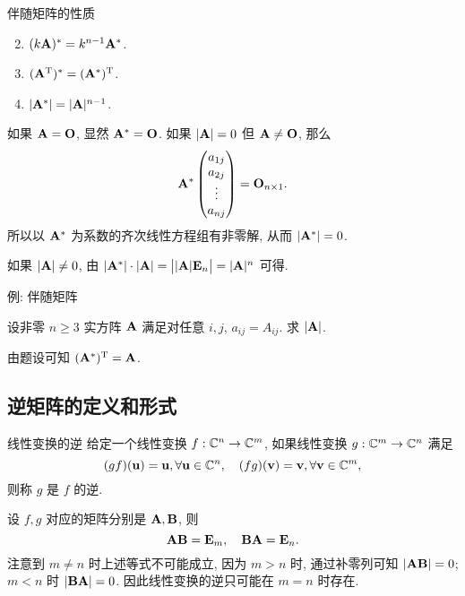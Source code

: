 \begin{frame}{伴随矩阵的性质}
	\onslide<+->
	\begin{block@}
		\begin{enumerate}
			\setcounter{enumi}{1}
			\item $(k{\mathbf{A}})^*=k^{n-1}{\mathbf{A}}^*$.
			\item $({\mathbf{A}}^{\mathrm{T}})^*=({\mathbf{A}}^*)^{\mathrm{T}}$.
			\item $|{\mathbf{A}}^*|=|{\mathbf{A}}|^{n-1}$.
		\end{enumerate}
	\end{block@}
	\onslide<+->
	如果 ${\mathbf{A}}={\mathbf{O}}$, 显然 ${\mathbf{A}}^*={\mathbf{O}}$.
	\onslide<+->
	如果 $|\bfA|=0$ 但 ${\mathbf{A}}\neq {\mathbf{O}}$, 那么
	\[{\mathbf{A}}^*\begin{pmatrix}
		a_{1j}\\a_{2j}\\\vdots\\a_{nj}
	\end{pmatrix}={\mathbf{O}}_{n\times 1}.\]
	\onslide<+->
	所以以 ${\mathbf{A}}^*$ 为系数的齐次线性方程组有非零解, 从而 $|{\mathbf{A}}^*|=0$.

	\onslide<+->
	如果 $|{\mathbf{A}}|\neq0$, 由 $|{\mathbf{A}}^*|\cdot|{\mathbf{A}}|=\bigl||{\mathbf{A}}|{\mathbf{E}}_n\bigr|=|{\mathbf{A}}|^n$ 可得.
\end{frame}


\begin{frame}{例: 伴随矩阵}
	\onslide<+->
	\begin{example}
		设非零 $n\ge 3$ 实方阵 ${\mathbf{A}}$ 满足对任意 $i,j$, $a_{ij}=A_{ij}$. 求 $|{\mathbf{A}}|$.
	\end{example}
	\onslide<+->
	\begin{solution}
		由题设可知 $({\mathbf{A}}^*)^{\mathrm{T}}={\mathbf{A}}$.
		\onslide<+->{%
		从而 $|\bfA|=0$ 或 $1$.
		}
		
	\end{solution}
\end{frame}


\subsection{逆矩阵的定义和形式}
\begin{frame}{线性变换的逆}
	\onslide<+->
	给定一个线性变换 $f:{\mathbb{C}}^n\rightarrow{\mathbb{C}}^m$, 如果线性变换 $g:{\mathbb{C}}^m\to{\mathbb{C}}^n$ 满足
	\[(gf)({\mathbf{u}})={\mathbf{u}},\forall {\mathbf{u}}\in{\mathbb{C}}^n,\quad
	(fg)({\mathbf{v}})={\mathbf{v}},\forall {\mathbf{v}}\in{\mathbb{C}}^m,\]
	\onslide<+->
	则称 $g$ 是 $f$ 的逆.

	\onslide<+->
	设 $f,g$ 对应的矩阵分别是 ${\mathbf{A}},{\mathbf{B}}$, 则
	\[{\mathbf{A}}{\mathbf{B}}={\mathbf{E}}_m,\quad {\mathbf{B}}{\mathbf{A}}={\mathbf{E}}_n.\]
	\onslide<+->
	注意到 $m\neq n$ 时上述等式不可能成立, 因为 $m>n$ 时, 通过补零列可知 $|{\mathbf{A}}{\mathbf{B}}|=0$; $m<n$ 时 $|{\mathbf{B}}{\mathbf{A}}|=0$.
	\onslide<+->
	因此线性变换的逆只可能在 $m=n$ 时存在.
\end{frame}


